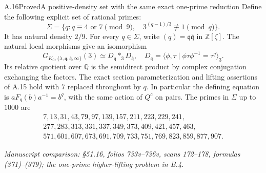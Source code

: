 \begin{statement}{A.16}{Proved}{A positive-density set with the same exact one-prime reduction}
Define the following explicit set of rational primes:
\[
 \Sigma=\{q:q\equiv4\text{ or }7\pmod9,
               \quad3^{(q-1)/3}\not\equiv1\pmod q\}.
 \tag{A.16.1}
\]
It has natural density $2/9$. For every $q\in\Sigma$, write
$(q)=\mathfrak q\overline{\mathfrak q}$ in $\mathbb Z[\zeta]$.
The natural local morphisms give an isomorphism
\[
 G_{K_0,\{\lambda,\mathfrak q,\overline{\mathfrak q},\infty\}}(3)
   \simeq D_{\mathfrak q}*_{3}D_{\overline{\mathfrak q}},
 \quad D_{\mathfrak q}=
       \langle\phi,\tau\mid\phi\tau\phi^{-1}=\tau^q\rangle_3.
 \tag{A.16.2}
\]
Its relative quotient over $\mathbb Q$ is the semidirect product
by complex conjugation exchanging the factors. The exact section
parameterization and lifting assertions of A.15 hold with $7$
replaced throughout by $q$. In particular the defining equation
is $aF_q(b)a^{-1}=b^q$, with the same action of $Q^c$ on pairs.
The primes in $\Sigma$ up to $1000$ are
\[
\begin{gathered}
7,13,31,43,79,97,139,157,211,223,229,241,\\
277,283,313,331,337,349,373,409,421,457,463,\\
571,601,607,673,691,709,733,751,769,823,859,877,907.
\end{gathered}
 \tag{A.16.3}
\]
\par\smallskip\noindent\emph{Manuscript comparison: \S51.16,
folios 733v--736v, scans 172--178, formulas (371)--(379); the
one-prime higher-lifting problem in B.4.}
\end{statement}
